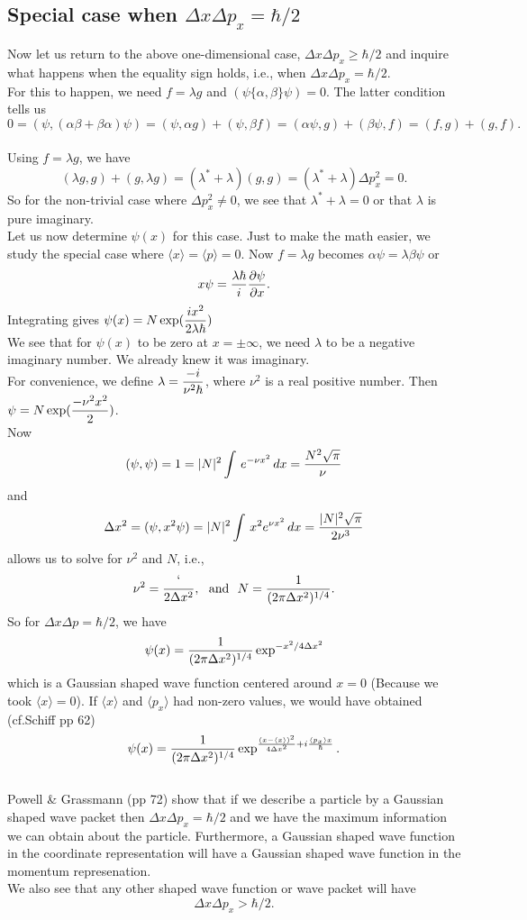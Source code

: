    \subsection{Special case when $\Delta x \Delta p_x =\hbar/2$}
   Now let us return to the above one-dimensional case, $\Delta x \Delta p_x \ge \hbar/2$ and inquire what happens when the equality sign holds, i.e., when $\Delta x\Delta p_x = \hbar/2$.\\   
   For this to happen, we need $f=\lambda g$ and $(\psi\{\alpha,\beta\}\psi) = 0$. The latter condition tells us 
   \[ 0 = (\psi,(\alpha\beta + \beta\alpha)\psi) = (\psi,\alpha g) + (\psi,\beta f) = (\alpha\psi,g) + (\beta\psi,f) = (f,g) + (g,f).\]\\
   Using $f=\lambda g$, we have
   \[ (\lambda g,g) + (g,\lambda g) = (\lambda^* + \lambda) (g,g) = (\lambda^* + \lambda)\Delta p_x^2 = 0.\]
   So for the non-trivial case where $\Delta p_x^2 \ne 0$, we see that $\lambda^* + \lambda = 0$ or that $\lambda$ is pure imaginary. \\
   Let us now determine $\psi(x)$ for this case. Just to make the math easier, we study the special case where $\langle x\rangle   = \langle p\rangle   = 0$. Now $f = \lambda g$ becomes $\alpha \psi = \lambda \beta \psi$ or
   $$x\psi = {\lambda \hbar\over i} {\partial \psi\over \partial x}.$$
   Integrating gives ${\displaystyle \psi(x) = N \exp({ix^2\over 2\lambda \hbar})}$\\
   We see that for $\psi(x)$ to be zero at $x=\pm \infty$, we need $\lambda$ to be a negative imaginary number. We already knew it was imaginary.\\
   For convenience, we define $\lambda = \displaystyle {-i\over \nu^2 \hbar}$, where $\nu^2$ is a real positive number. Then $\displaystyle \psi = N\exp({-\nu^2 x^2\over 2})$. \\
   Now  $$(\psi,\psi) = 1 = |N|^2 \int\, e^{-\nu x^2}\, dx = {N^2\sqrt{\pi}\over \nu}$$ and 
   $$\Delta x^2 = (\psi, x^2\psi) = |N|^2 \int\, x^2 e^{\nu x^2}\, dx = {|N|^2 \sqrt{\pi}\over 2\nu^3}$$
   allows us to solve for $\nu^2$ and $N$, i.e., 
   $$\nu^2 = {`\over 2\Delta x^2},~~\hbox{and}~~N = {1\over (2\pi\Delta x^2)^{1/4} }.$$
   So for $\Delta x \Delta p = \hbar/2$, we have 
   $$\psi(x) = {1\over (2\pi\Delta x^2)^{1/4} }\exp^{-x^2 /4\Delta x^2}$$ which is a Gaussian shaped wave function centered around $x = 0$ (Because we took $\langle x\rangle = 0$). 
   If $\langle x \rangle$ and $\langle p_x\rangle$ had non-zero values, we would have obtained (cf.Schiff pp 62)
   $$\psi(x) = {1\over (2\pi\Delta x^2)^{1/4} }\exp ^{ {(x-\langle x\rangle)^2\over 4 \Delta x^2} + i {\langle p_x\rangle x\over \hbar} }.$$ \\
   Powell \& Grassmann (pp 72) show that if we describe a particle by a Gaussian shaped wave packet then $\Delta x \Delta p_x = \hbar/2$ and we have the maximum information we can obtain about the particle. 
   Furthermore, a Gaussian shaped wave function in the coordinate representation will have a Gaussian shaped wave function in the momentum represenation. \\
   We also see that any other shaped wave function or wave packet will have $$\Delta x\Delta p_x > \hbar/2.$$
   
   